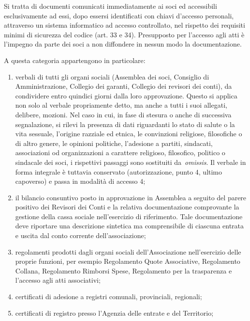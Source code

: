 Si tratta di documenti comunicati immediatamente ai soci ed accessibili
esclusivamente ad essi, dopo essersi identificati con chiavi d'accesso
personali, attraverso un sistema informatico ad accesso controllato, nel
rispetto dei requisiti minimi di sicurezza del codice (art. 33 e 34).
Presupposto per l'accesso agli atti è l'impegno da parte dei soci a non
diffondere in nessun modo la documentazione.  

A questa categoria appartengono in particolare:

\begin{enumerate}
    \item verbali di tutti gli organi sociali (Assemblea dei soci, Consiglio
        di Amministrazione, Collegio dei garanti, Collegio dei revisori dei
        conti), da condividere entro quindici giorni dalla loro
        approvazione. Questo si applica non solo al verbale propriamente
        detto, ma anche a tutti i suoi allegati, delibere, mozioni.
        Nel caso in cui, in fase di stesura o anche di successiva segnalazione, si
        rilevi la presenza di dati riguardanti lo stato di salute o la vita
        sessuale, l'origine razziale ed etnica, le convinzioni religiose,
        filosofiche o di altro genere, le opinioni politiche, l'adesione a partiti,
        sindacati, associazioni od organizzazioni a carattere religioso, filosofico,
        politico o sindacale dei soci, i rispettivi passaggi sono sostituiti
        da \emph{omissis}. Il verbale in forma integrale è tuttavia conservato
        (autorizzazione, punto 4, ultimo capoverso) e passa in modalità di accesso
        4;
    \item il bilancio consuntivo posto in approvazione in Assemblea a seguito
        del parere positivo dei Revisori dei Conti e la relativa
        documentazione comprovante la gestione della cassa sociale
        nell'esercizio di riferimento. Tale documentazione deve riportare
        una descrizione sintetica ma comprensibile di ciascuna entrata e uscita
        dal conto corrente dell'associazione;
    \item regolamenti prodotti dagli organi sociali dell'Associazione
        nell'esercizio delle proprie funzioni, per esempio Regolamento Quote
        Associative, Regolamento Collana, Regolamento Rimborsi Spese,
        Regolamento per la trasparenza e l'accesso agli atti associativi;
    \item certificati di adesione a registri comunali, provinciali, regionali;
    \item certificati di registro presso l'Agenzia delle entrate e del Territorio;

\end{enumerate}
